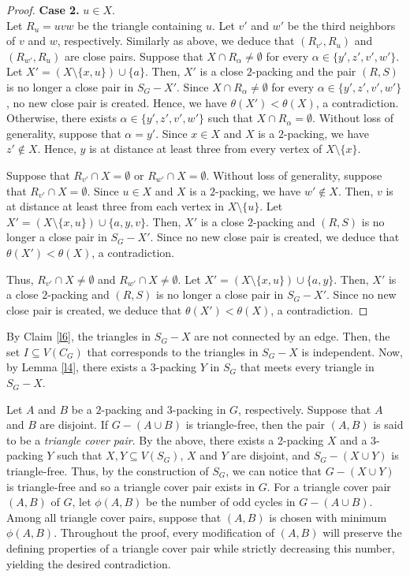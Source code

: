 \documentclass[12pt, oneside]{scrartcl}
\begin{document}
\begin{proof}
\medskip
\noindent
\textbf{Case 2.} $u\in X$.
\\
Let $R_u=uvw$ be the triangle containing $u$. Let $v'$ and $w'$ be the third neighbors of $v$ and $w$, respectively. Similarly as above, we deduce that $(R_{v'},R_u)$ and $(R_{w'},R_u)$ are close pairs. 
Suppose that $X\cap R_{\alpha}\neq\emptyset $ for every $\alpha\in\{y',z',v',w'\}$. Let $X'=(X\setminus\{x,u\})\cup\{a\}$.
Then, $X'$ is a close $2$-packing and the pair $(R,S)$ is no longer a close pair in $S_G-X'$. Since $X\cap R_{\alpha}\neq\emptyset $ for every $\alpha\in\{y',z',v',w'\}$, no new close pair is created. Hence, we have $\theta(X')<\theta(X)$, a contradiction.
Otherwise, there exists $\alpha \in\{y',z',v',w'\}$ such that $X\cap R_{\alpha}=\emptyset $.  Without loss of generality, suppose that $\alpha=y'$. Since $x\in X$ and $X$ is a $2$-packing, we have $z'\notin X$. Hence, $y$ is at distance at least three from every vertex of $X\setminus\{x\}$.

Suppose that $R_{v'}\cap X =\emptyset$ or $R_{w'}\cap X =\emptyset$. Without loss of generality, suppose that $R_{v'}\cap X =\emptyset$. Since $u\in X$ and $X$ is a $2$-packing, we have $w'\notin X$. Then, $v$ is at distance at least three from each vertex in $X\setminus \{u\}$.
Let $X'=(X\setminus\{x,u\})\cup\{a,y,v\}.$
Then, $X'$ is a close $2$-packing and $(R,S)$ is no longer a close pair in $S_G-X'$. Since no new close pair is created, we deduce that $\theta(X')<\theta(X)$, a contradiction.

Thus, $R_{v'}\cap X \neq \emptyset$ and $R_{w'}\cap X \neq \emptyset$. Let $X'=(X\setminus\{x,u\})\cup\{a,y\}.$
Then, $X'$ is a close $2$-packing and $(R,S)$ is no longer a close pair in $S_G-X'$. Since no new close pair is created, we deduce that $\theta(X')<\theta(X)$, a contradiction.    
\end{proof}

By Claim \ref{l6}, the triangles in $S_G-X$ are not connected by an edge. Then, the set $I\subseteq V(C_G)$ that corresponds to the triangles in $S_G-X$ is independent. Now, by Lemma \ref{l4}, there exists a $3$-packing $Y$ in $S_G$ that meets every triangle in $S_G-X$.

Let $A$ and $B$ be a $2$-packing and $3$-packing in $G$, respectively. Suppose that $A$ and $B$ are disjoint. If $G-(A\cup B)$ is triangle-free, then the pair $(A,B)$ is said to be a \textit{triangle cover pair}. By the above, there exists a 2-packing $X$ and a 3-packing $Y$ such that $X,Y\subseteq V(S_G)$, $X$ and $Y$ are disjoint, and $S_G-(X\cup Y)$  is triangle-free. Thus, by the construction of $S_G$, we can notice that $G-(X\cup Y)$ is triangle-free and so a triangle cover pair exists in $G$. For a triangle cover pair $(A,B)$ of $G$, let $\phi(A,B)$ be the number of odd cycles in $G-(A\cup B)$. Among all triangle cover pairs, suppose that $(A,B)$ is chosen with minimum $\phi(A,B)$. Throughout the proof, every modification of $(A,B)$ will preserve the defining properties of a triangle cover pair while strictly decreasing this number, yielding the desired contradiction.
\end{document}
